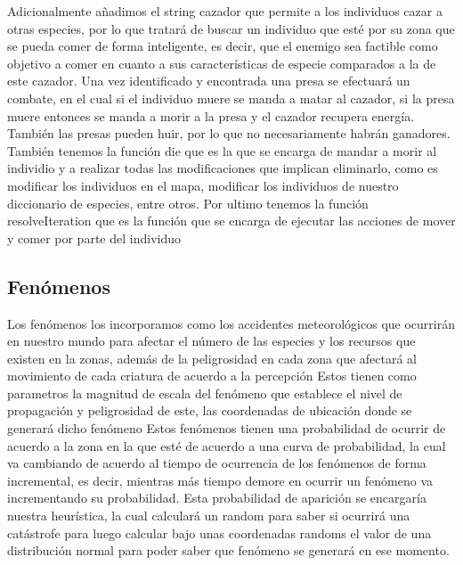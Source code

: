 \documentclass{llncs}
\begin{document}
\newline
Adicionalmente añadimos el string cazador que permite a los individuos cazar a otras especies, por lo que tratará de buscar un individuo que esté por su zona que se pueda comer de forma inteligente, es decir, que el enemigo sea factible como objetivo a comer en cuanto a sus características de especie comparados a la de este cazador.
\newline
Una vez identificado y encontrada una presa se efectuará un combate, en el cual si el individuo muere se manda a matar al cazador, si la presa muere entonces se manda a morir a la presa y el cazador recupera energía. También las presas pueden huir, por lo que no necesariamente habrán ganadores.
\newline
\newline
También tenemos la función die que es la que se encarga de mandar a morir al individio y a realizar todas las modificaciones que implican eliminarlo, como es modificar los individuos en el mapa, modificar los individuos de nuestro diccionario de especies, entre otros.
\newline
\newline
Por ultimo tenemos la función resolveIteration que es la función que se encarga de ejecutar las acciones de mover y comer por parte del individuo
 

\subsection{Fenómenos}

Los fenómenos los incorporamos como los accidentes meteorológicos que ocurrirán en nuestro mundo para afectar el número de las especies y los recursos que existen en la zonas, además de la peligrosidad en cada zona que afectará al movimiento de cada criatura de acuerdo a la percepción
\newline
\newline
Estos tienen como parametros la magnitud de escala del fenómeno que establece el nivel de propagación y peligrosidad de este, las coordenadas de ubicación donde se generará dicho fenómeno
\newline
\newline
Estos fenómenos tienen una probabilidad de ocurrir de acuerdo a la zona en la que esté de acuerdo a una curva de probabilidad, la cual va cambiando de acuerdo al tiempo de ocurrencia de los fenómenos de forma incremental, es decir, mientras más tiempo demore en ocurrir un fenómeno va incrementando su probabilidad. Esta probabilidad de aparición se encargaría nuestra heurística, la cual calculará un random para saber si ocurrirá una catástrofe para luego calcular bajo unas coordenadas randoms el valor de una distribución normal para poder saber que fenómeno se generará en ese momento.
\end{document}
